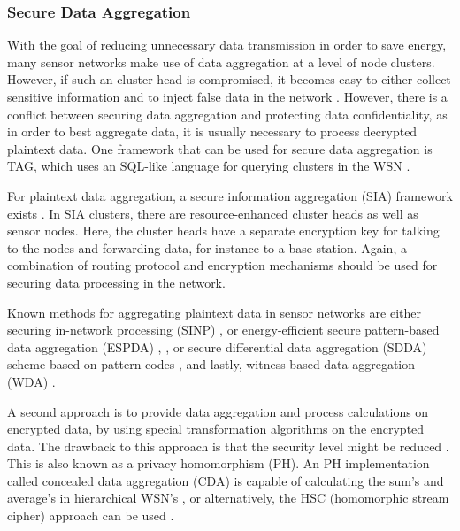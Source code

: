 \documentclass[12pt,a4paper,twoside]{report}
\begin{document}
\subsubsection{Secure Data Aggregation}
With the goal of reducing unnecessary data transmission in order to save energy, many sensor networks make use of data aggregation at a level of node clusters. However, if such an cluster head is compromised, it becomes easy to either collect sensitive information and to inject false data in the network \cite{sen:2009}. However, there is a conflict between securing data aggregation and protecting data confidentiality, as in order to best aggregate data, it is usually necessary to process decrypted plaintext data. One framework that can be used for secure data aggregation is TAG, which uses an SQL-like language for querying clusters in the WSN \cite{sen:2009}.\par
For plaintext data aggregation, a secure information aggregation (SIA) framework exists \cite{sen:2009}. In SIA clusters, there are resource-enhanced cluster heads as well as sensor nodes. Here, the cluster heads have a separate encryption key for talking to the nodes and forwarding data, for instance to a base station. Again, a combination of routing protocol and encryption mechanisms should be used for securing data processing in the network.\par
Known methods for aggregating plaintext data in sensor networks are either securing in-network processing (SINP) \cite{deng;etal:2003} , or energy-efficient secure pattern-based data aggregation (ESPDA) \cite{cam;etal:2003}, \cite{cam;etal:2005}, or secure differential data aggregation (SDDA) scheme based on pattern codes \cite{cam;etal:2004} , and lastly, witness-based data aggregation (WDA) \cite{du;etal:2003}.\par
A second approach is to provide data aggregation and process calculations on encrypted data, by using special transformation algorithms on the encrypted data. The drawback to this approach is that the security level might be reduced \cite{sen:2009}. This is also known as a privacy homomorphism (PH). An PH implementation called concealed data aggregation (CDA) is capable of calculating the sum's and average's in hierarchical WSN's \cite{girao;etal:2005}, or alternatively, the HSC (homomorphic stream cipher) approach can be used \cite{castelluccia;etal:2005} .\par
\iffalse
\end{document}

